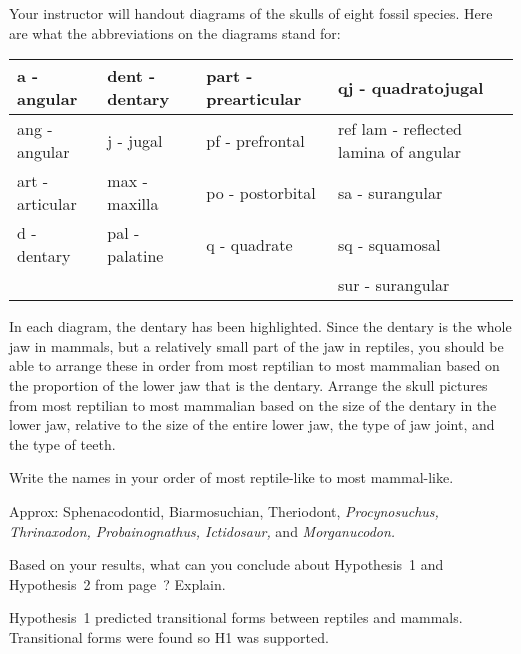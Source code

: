 \documentclass[12pt, hidelinks]{exam}
\newcommand*\AnswerBox[2]{%
    \parbox[t][#1]{0.92\textwidth}{%
    \begin{solution}#2\end{solution}}
    \vspace{\stretch{1}}
}
\begin{document}
\begin{questions}
Your instructor will handout diagrams of the skulls of eight fossil species.
Here are what the abbreviations on the diagrams stand for:

\begin{longtable}[c]{@{}L{0.22\textwidth}L{0.22\textwidth}L{0.22\textwidth}L{0.22\textwidth}@{}}
\toprule
a - angular & dent - dentary & part - prearticular & qj -
quadratojugal\tabularnewline
\midrule
\endhead
ang - angular & j - jugal & pf - prefrontal & ref lam - reflected lamina
of angular\tabularnewline
art - articular & max - maxilla & po - postorbital & sa -
surangular\tabularnewline
d - dentary & pal - palatine & q - quadrate & sq -
squamosal\tabularnewline
& & & sur - surangular\tabularnewline
\bottomrule
\end{longtable}

In each diagram, the dentary has been highlighted. Since the dentary is the whole jaw in mammals, but a relatively
small part of the jaw in reptiles, you should be able to arrange these
in order from most reptilian to most mammalian based on the proportion
of the lower jaw that is the dentary. Arrange the skull pictures from most reptilian to most mammalian based on the
size of the dentary in the lower jaw, relative to the size of the entire
lower jaw, the type of jaw joint, and the type of teeth.

\question \label{order_question}
Write the names in your order of most reptile-like to most mammal-like.

\AnswerBox{2\baselineskip}{Approx: Sphenacodontid, Biarmosuchian,
Theriodont, \textit{Procynosuchus, Thrinaxodon, Probainognathus, Ictidosaur,} and \textit{Morganucodon.}}

%
%
%
%
\question
Based on your results, what can you conclude about Hypothesis~1 and Hypothesis~2 from page~\pageref{hypothesis1}? Explain.

\AnswerBox{2\baselineskip}{%
Hypothesis~1 predicted transitional forms between reptiles and mammals. Transitional forms were found so H1 was supported. %
}


\end{questions}
\end{document}
